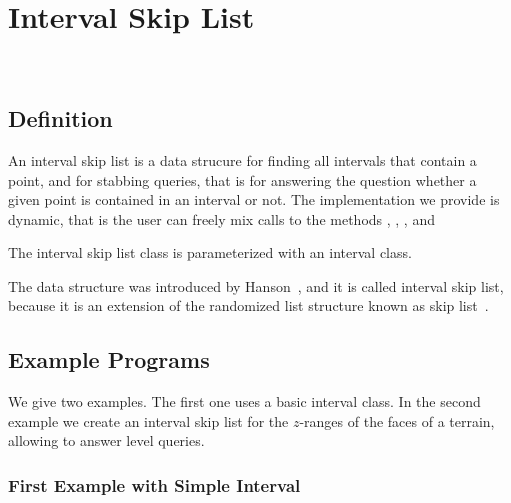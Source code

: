 
\ccParDims

\chapter{Interval Skip List}
\label{chapter_Interval_skip_list}
\\




\section{Definition}
  
An interval skip list is a data strucure for finding all intervals 
that contain a point, and for stabbing queries, that is for answering 
the question whether a given point is contained in an interval or not. 
The implementation we provide is dynamic, that is the user can freely
mix calls  to the methods , , 
, and 

The interval skip list class is parameterized with an interval class.

The data structure was introduced by Hanson~\cite{h-islds-91}, and it is called
interval skip list, because it is an extension of the randomized list
structure known as skip list~\cite{p-slpab-90}.
 
\section{Example Programs}
\label{sectionIntervalskiplistExamples}

We give two examples. The first one uses a basic interval class.  In
the second example we create an interval skip list for the $z$-ranges
of the faces of a terrain, allowing to answer level queries.

\subsection{First Example with Simple Interval}

